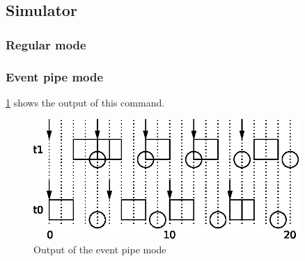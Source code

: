 \subsection{Simulator}


\subsubsection{Regular mode}




\subsubsection{Event pipe mode}


\ref{fig:use:1} shows the output of this command.

\begin{figure}
	\centering
	\includegraphics[width=0.9\textwidth]{../schedule/eps/1.eps}
	\caption{Output of the event pipe mode}
	\label{fig:use:1}
\end{figure}
